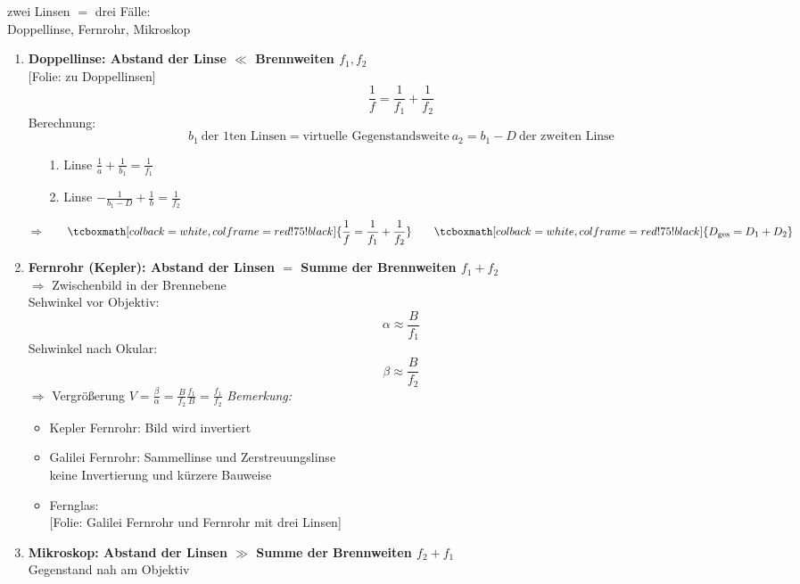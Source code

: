 \documentclass[titlepage,11pt,a4paper,ngerman]{report}
\newcommand{\tx}[1]{\textrm{#1}}
\newcommand{\folie}[1]{\color{gray}[Folie: #1]\color{black}}
\newcommand{\rmbox}[1]{\tcboxmath[colback=white,colframe=red!75!black]{#1}}
\begin{document}
zwei Linsen $ = $ drei Fälle:\\[5pt]
Doppellinse, Fernrohr, Mikroskop\\[5pt]
\begin{enumerate}[1)]
	\item \textbf{Doppellinse: Abstand der Linse $ \ll $ Brennweiten $ f_1,f_2 $}\\
	\folie{zu Doppellinsen}
	\begin{equation*}
	\frac{1}{f} = \frac{1}{f_1} + \frac{1}{f_2}
	\end{equation*}
	Berechnung:
	\begin{equation*}
	b_1 \ \tx{der 1ten Linsen} = \tx{virtuelle Gegenstandsweite} \ a_2 = b_1 - D \ \tx{der zweiten Linse}
	\end{equation*}
	\begin{itemize}
		\item[1. Linse] $ \frac{1}{a} + \frac{1}{b_1} = \frac{1}{f_1} $
		\item[2. Linse] $ -\frac{1}{b_1 - D} + \frac{1}{b} = \frac{1}{f_2} $
	\end{itemize}
	\begin{equation*}
	\Rightarrow \qquad \rmbox{\frac{1}{f} = \frac{1}{f_1} + \frac{1}{f_2}} \qquad \rmbox{D_{\tx{ges}} = D_1 + D_2}
	\end{equation*}
	\item \textbf{Fernrohr (Kepler): Abstand der Linsen $ = $ Summe der Brennweiten $ f_1 + f_2 $}\\
	
	$ \Rightarrow $ Zwischenbild in der Brennebene\\[10pt]
	Sehwinkel vor Objektiv:
	\begin{equation*}
	\alpha \approx \frac{B}{f_1}
	\end{equation*}
	Sehwinkel nach Okular:
	\begin{equation*}
	\beta \approx \frac{B}{f_2}
	\end{equation*}
	$ \Rightarrow $ Vergrößerung $ V = \frac{\beta}{\alpha} = \frac{B}{f_2} \frac{f_1}{B} = \frac{f_1}{f_2} $
	\emph{Bemerkung:}
	\begin{itemize}
		\item Kepler Fernrohr: Bild wird invertiert
		\item Galilei Fernrohr: Sammellinse und Zerstreuungslinse\\
		keine Invertierung und kürzere Bauweise
		\item Fernglas:\\
		\folie{Galilei Fernrohr und Fernrohr mit drei Linsen}
	\end{itemize}
	\item \textbf{Mikroskop: Abstand der Linsen $ \gg $ Summe der Brennweiten $ f_2 + f_1 $}\\
	Gegenstand nah am Objektiv
	

\end{enumerate}
\end{document}
